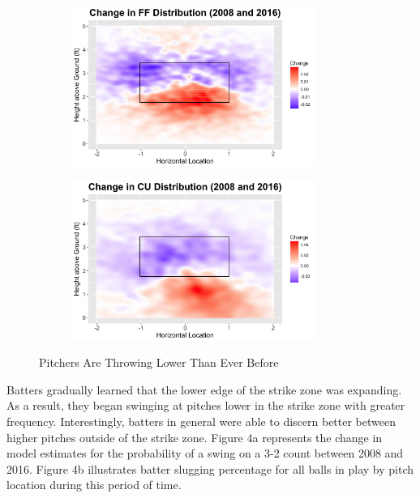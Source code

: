 \documentclass[11pt]{article}
\begin{document}
\begin{figure}[ht]
\centering
\begin{subfigure}[b]{0.48\textwidth}
\centering
\includegraphics[height = 5.2cm]{../Output/fig3a.png}
\end{subfigure}
\begin{subfigure}[b]{0.48\textwidth}
\centering
\includegraphics[height = 5.2cm]{../Output/fig3b.png}
\end{subfigure}
\caption{Pitchers Are Throwing Lower Than Ever Before}
\end{figure}

Batters gradually learned that the lower edge of the strike zone was expanding.  As a result, they began swinging at pitches lower in the strike zone with greater frequency.  Interestingly, batters in general were able to discern better between higher pitches outside of the strike zone.  Figure 4a represents the change in model estimates for the probability of a swing on a 3-2 count between 2008 and 2016.  Figure 4b illustrates batter slugging percentage for all balls in play by pitch location during this period of time.
\end{document}
